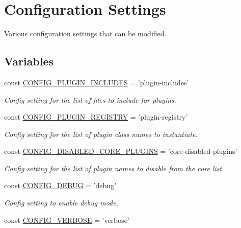 \hypertarget{group__config}{\section{Configuration Settings}
\label{group__config}
}


Various configuration settings that can be modified.  


\subsection*{Variables}
\begin{DoxyCompactItemize}
\item 
const \hyperlink{group__config_ga6a85183e9c9f8aaa564fe3ab89f5c155}{C\-O\-N\-F\-I\-G\-\_\-\-P\-L\-U\-G\-I\-N\-\_\-\-I\-N\-C\-L\-U\-D\-E\-S} = 'plugin-\/includes'
\begin{DoxyCompactList}\small\item\em Config setting for the list of files to include for plugins. \end{DoxyCompactList}\item 
const \hyperlink{group__config_gac9a4a3df52ecff6e3489e2834c8d6464}{C\-O\-N\-F\-I\-G\-\_\-\-P\-L\-U\-G\-I\-N\-\_\-\-R\-E\-G\-I\-S\-T\-R\-Y} = 'plugin-\/registry'
\begin{DoxyCompactList}\small\item\em Config setting for the list of plugin class names to instantiate. \end{DoxyCompactList}\item 
const \hyperlink{group__config_gabc38296098bf02b2418bd83602e56edc}{C\-O\-N\-F\-I\-G\-\_\-\-D\-I\-S\-A\-B\-L\-E\-D\-\_\-\-C\-O\-R\-E\-\_\-\-P\-L\-U\-G\-I\-N\-S} = 'core-\/disabled-\/plugins'
\begin{DoxyCompactList}\small\item\em Config setting for the list of plugin names to disable from the core list. \end{DoxyCompactList}\item 
const \hyperlink{group__config_ga45d0602aad6bc9cbe04270b059d48bcd}{C\-O\-N\-F\-I\-G\-\_\-\-D\-E\-B\-U\-G} = 'debug'
\begin{DoxyCompactList}\small\item\em Config setting to enable debug mode. \end{DoxyCompactList}\item 
const \hyperlink{group__config_gad09ed47ac67500b2ba6cc4a88d667a67}{C\-O\-N\-F\-I\-G\-\_\-\-V\-E\-R\-B\-O\-S\-E} = 'verbose'

\end{DoxyCompactItemize}
